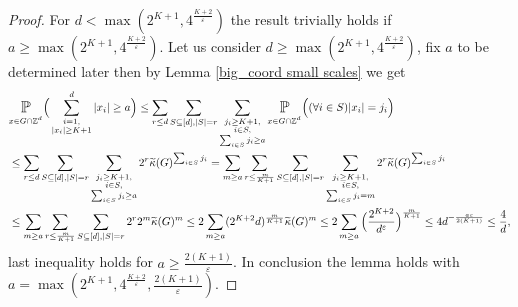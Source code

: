 \documentclass[10pt,a4paper]{amsart}
\numberwithin{equation}{section}
\newcommand{\Pro}{\mathop{\mathbb{P}}}
\newcommand{\Z}{\mathbb{Z}}
\newcommand{\spr}[1]{\underset{_{\substack{#1}}}{\mathlarger{\mathlarger{\Pro}}}}
\begin{document}
\begin{proof}
For $d < \max(2^{K+1},4^{\frac{K+2}{\varepsilon}})$ the result trivially holds if $a  \ge \max(2^{K+1},4^{\frac{K+2}{\varepsilon}})$. 
Let us consider $d \ge \max(2^{K+1},4^{\frac{K+2}{\varepsilon}})$, fix $a$ to be determined later then by Lemma \ref{big_coord small scales} we get  
\begin{align*}
&\spr{x \in G \cap \Z^d} \Big(\sum_{\substack{i=1, \\ |x_i| \ge K+1}}^d 
|x_i| \ge a \Big)  \le \sum_{r \le d } \sum_{S \subseteq [d], |S|=r} \sum_{\substack{j_i \ge K+1,\\i \in S, \\
\sum_{i\in S} j_i \ge a}}\spr{x \in G \cap \Z^d} \Big( (\forall i \in S) |x_i| =j_i\Big) \\
&\le \sum_{r \le d } \sum_{S \subseteq [d], |S|=r} \sum_{\substack{j_i \ge K+1,\\i \in S, \\
\sum_{i\in S} j_i \ge a}} 2^r \widetilde{\kappa}(G)^{\sum_{i \in S}j_i} = \sum_{m \ge a}\sum_{r \le \frac{m}{K+1} } \sum_{S \subseteq [d], |S|=r} \sum_{\substack{j_i \ge K+1,\\i \in S, \\
\sum_{i\in S} j_i =m}} 2^r \widetilde{\kappa}(G)^{\sum_{i \in S}j_i} \\
&\le \sum_{m \ge a}\sum_{r \le \frac{m}{K+1} } \sum_{S \subseteq [d], |S|=r}  2^r 2^{m} \widetilde{\kappa}(G)^m \le 2 \sum_{m \ge a} (2^{K+2}d)^{ \frac{m}{K+1}} \widetilde{\kappa}(G)^m \le 2 \sum_{m \ge a} \Big(\frac{2^{K+2}}{d^\varepsilon} \Big)^{\frac{m}{K+1}} \le 4d ^{-\frac{a\varepsilon}{2(K+1)}} \le \frac{4}{d},
\end{align*}
last inequality holds for $a \ge \frac{2(K+1)}{\varepsilon}$.
In conclusion the lemma holds with $a=\max(2^{K+1},4^{\frac{K+2}{\varepsilon}}, \frac{2(K+1)}{\varepsilon})$.
\end{proof}
\end{document}
